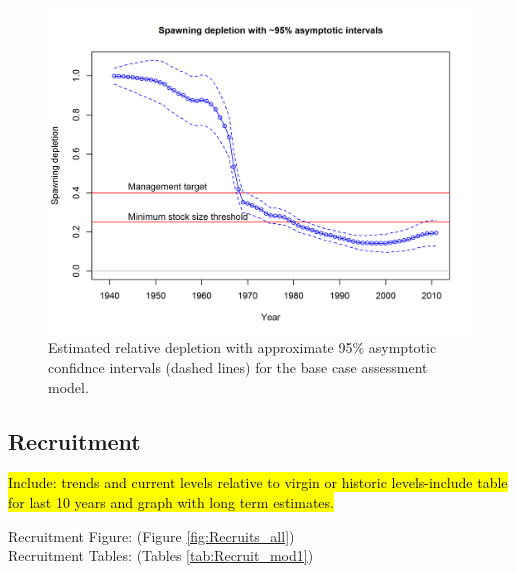 \documentclass[12pt,]{article}
\begin{document}
\begin{figure}
\centering
\includegraphics{r4ss/plots_mod1/ts9_Spawning_depletion_with_95_asymptotic_intervals_intervals.png}
\caption{Estimated relative depletion with approximate 95\% asymptotic
confidnce intervals (dashed lines) for the base case assessment model.
\label{fig:RelDeplete_all}}
\end{figure}

\FloatBarrier

\subsection*{Recruitment}\label{recruitment}

\hl{Include: trends and current levels relative to virgin or historic levels-include 
table for last 10 years and graph with long term estimates.}

Recruitment Figure: (Figure \ref{fig:Recruits_all})\\
Recruitment Tables: (Tables \ref{tab:Recruit_mod1})
\end{document}
